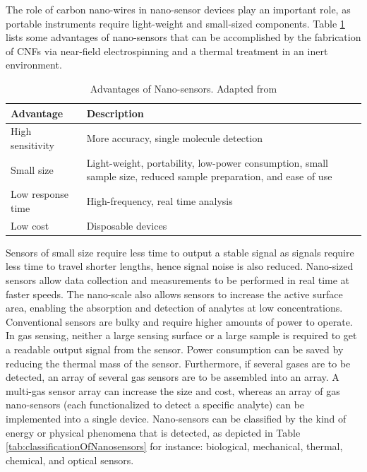 
The role of carbon nano-wires in nano-sensor devices play an important role, as portable instruments require light-weight and small-sized components. \cite{Khanna2016} Table \ref{tab:advantagesOfNanosensors} lists some advantages of nano-sensors that can be accomplished by the fabrication of CNFs via near-field electrospinning and a thermal treatment in an inert environment.

\begin{table}[!th]
\centering
\caption[Advantages of Nano-sensors]{Advantages of Nano-sensors. Adapted from \cite{Khanna2016}}
\begin{tabularx}{\textwidth}{lX}
\hline
\textbf{Advantage} & \textbf{Description} \\
\hline
High sensitivity & More accuracy, single molecule detection \\
Small size & Light-weight, portability, low-power consumption, small sample size, reduced sample preparation, and ease of use \\
Low response time & High-frequency, real time analysis \\
Low cost & Disposable devices \\
\hline
\end{tabularx}
\label{tab:advantagesOfNanosensors}
\end{table}

Sensors of small size require less time to output a stable signal as signals require less time to travel shorter lengths, hence signal noise is also reduced. Nano-sized sensors allow data collection and measurements to be performed in real time at faster speeds. \cite{Khanna2016} The nano-scale also allows sensors to increase the active surface area, enabling the absorption and detection of analytes at low concentrations. \cite{Khanna2016} Conventional sensors are bulky and require higher amounts of power to operate. In gas sensing, neither a large sensing surface or a large sample is required to get a readable output signal from the sensor. Power consumption can be saved by reducing the thermal mass of the sensor. \cite{Khanna2016} Furthermore, if several gases are to be detected, an array of several gas sensors are to be assembled into an array. A multi-gas sensor array can increase the size and cost, whereas an array of gas nano-sensors (each functionalized to detect a specific analyte) can be implemented into a single device. \cite{Khanna2016} Nano-sensors can be classified by the kind of energy or physical phenomena that is detected, as depicted in Table \ref{tab:classificationOfNanosensors} for instance: biological, mechanical, thermal, chemical, and optical sensors. \cite{Khanna2016, BaudritJ2017}

